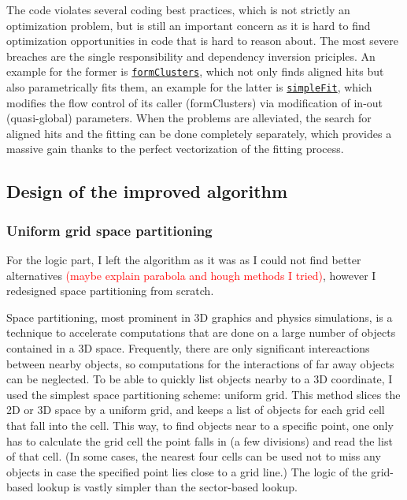 \documentclass[12pt]{article}
\newcommand{\code}[1]{\texttt{#1}}
\begin{document}
The code violates several coding best practices, which is not strictly an optimization problem, but is still an important concern as it is hard to find optimization opportunities in code that is hard to reason about. The most severe breaches are the single responsibility and dependency inversion priciples. An example for the former is \href{https://gitlab.cern.ch/lhcb/Rec/blob/1b7edc5aea96f2225601238b3f64e478e41b6c70/Pr/PrVeloUT/src/PrVeloUT.cpp#L337}{\code{formClusters}}, which not only finds aligned hits but also parametrically fits them, an example for the latter is \href{https://gitlab.cern.ch/lhcb/Rec/blob/1b7edc5aea96f2225601238b3f64e478e41b6c70/Pr/PrVeloUT/src/PrVeloUT.h#L191}{\code{simpleFit}}, which modifies the flow control of its caller (formClusters) via modification of in-out (quasi-global) parameters. When the problems are alleviated, the search for aligned hits and the fitting can be done completely separately, which provides a massive gain thanks to the perfect vectorization of the fitting process.


\subsection{Design of the improved algorithm}

\subsubsection{Uniform grid space partitioning}\label{sec_velout_space_partitioning}

For the logic part, I left the algorithm as it was as I could not find better alternatives \textcolor{red}{(maybe explain parabola and hough methods I tried)}, however I redesigned space partitioning from scratch.
\vspace{1pc}

Space partitioning, most prominent in 3D graphics and physics simulations, is a technique to accelerate computations that are done on a large number of objects contained in a 3D space. Frequently, there are only significant intereactions between nearby objects, so computations for the interactions of far away objects can be neglected. To be able to quickly list objects nearby to a 3D coordinate, I used the simplest space partitioning scheme: uniform grid. This method slices the 2D or 3D space by a uniform grid, and keeps a list of objects for each grid cell that fall into the cell. This way, to find objects near to a specific point, one only has to calculate the grid cell the point falls in (a few divisions) and read the list of that cell. (In some cases, the nearest four cells can be used not to miss any objects in case the specified point lies close to a grid line.) The logic of the grid-based lookup is vastly simpler than the sector-based lookup.
\vspace{1pc}
\end{document}
